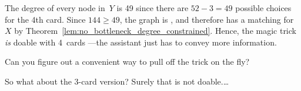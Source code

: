 \begin{editingnotes}
The degree of every node in~$Y$ is 49 since there are $52 - 3 = 49$
possible choices for the 4th card.  Since $144 \ge 49$, the graph is
, and therefore has a matching for~$X$ by
Theorem~\ref{lem:no_bottleneck_degree_constrained}.
Hence, the magic trick \emph{is} doable with 4~cards ---the assistant
just has to convey more information.  


Can you figure out a convenient
way to pull off the trick on the fly?

So what about the 3-card version?  Surely that is not doable.\dots
\end{editingnotes}


\begin{problems}
\classproblems
{}

\homeworkproblems
{}

\end{problems}


